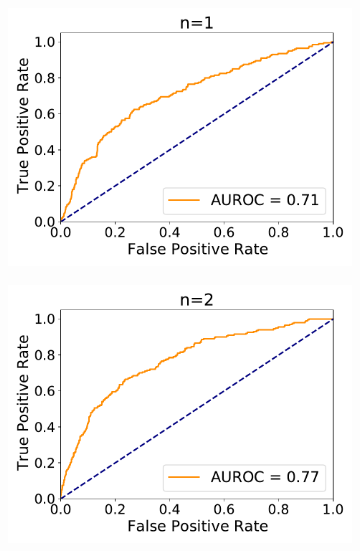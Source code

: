 \begin{figure}[H]
	\begin{subfigure}{.33\textwidth}
		\centering
		\includegraphics[width=1\linewidth]{figures/roc_analysis/roc_particleFilter/AUROC_2000samples_class0_llh_n1}
		\caption{}
		\label{fig:roc_part_n1}
	\end{subfigure}%
	\begin{subfigure}{.33\textwidth}
		\centering
		\includegraphics[width=1\linewidth]{figures/roc_analysis/roc_particleFilter/AUROC_2000samples_class0_llh_n2}
		\caption{}
		\label{fig:roc_part_n2}
	\end{subfigure}
	\begin{subfigure}{.33\textwidth}
		\centering

\end{subfigure}
\end{figure}

